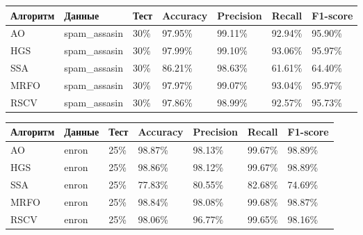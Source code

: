 \begin{table}[!ht]
    \centering
    \begin{tabular}{|p{}|p{}|p{}|p{}|p{}|p{}|p{}|}
        \hline
        Алгоритм & Данные        & Тест & Accuracy & Precision & Recall  & F1-score \\ \hline
        AO       & spam\_assasin & 30\% & 97.95\%  & 99.11\%   & 92.94\% & 95.90\%  \\ \hline
        HGS      & spam\_assasin & 30\% & 97.99\%  & 99.10\%   & 93.06\% & 95.97\%  \\ \hline
        SSA      & spam\_assasin & 30\% & 86.21\%  & 98.63\%   & 61.61\% & 64.40\%  \\ \hline
        MRFO     & spam\_assasin & 30\% & 97.97\%  & 99.07\%   & 93.04\% & 95.97\%  \\ \hline
        RSCV     & spam\_assasin & 30\% & 97.86\%  & 98.99\%   & 92.57\% & 95.73\%  \\ \hline
    \end{tabular}
\end{table}

\begin{table}[!ht]
    \centering
    \begin{tabular}{|p{}|p{}|p{}|p{}|p{}|p{}|p{}|}
        \hline
        Алгоритм & Данные & Тест & Accuracy & Precision & Recall  & F1-score \\ \hline
        AO       & enron  & 25\% & 98.87\%  & 98.13\%   & 99.67\% & 98.89\%  \\ \hline
        HGS      & enron  & 25\% & 98.86\%  & 98.12\%   & 99.67\% & 98.89\%  \\ \hline
        SSA      & enron  & 25\% & 77.83\%  & 80.55\%   & 82.68\% & 74.69\%  \\ \hline
        MRFO     & enron  & 25\% & 98.84\%  & 98.08\%   & 99.68\% & 98.87\%  \\ \hline
        RSCV     & enron  & 25\% & 98.06\%  & 96.77\%   & 99.65\% & 98.16\%  \\ \hline
    \end{tabular}
\end{table}


